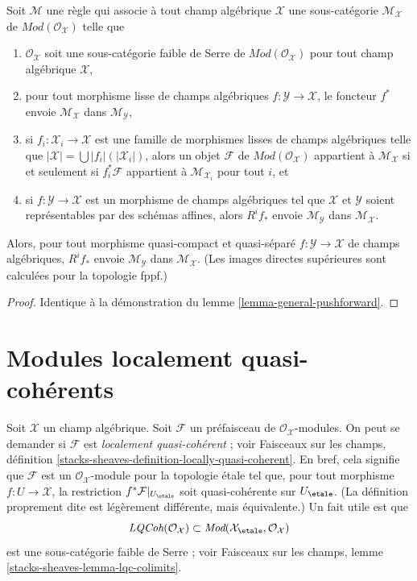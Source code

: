 \begin{lemma}
\label{lemma-general-pushforward-fppf}
Soit $\mathcal{M}$ une règle qui associe à tout champ algébrique
$\mathcal{X}$ une sous-catégorie $\mathcal{M}_\mathcal{X}$ de
$\textit{Mod}(\mathcal{O}_\mathcal{X})$
telle que
\begin{enumerate}
\item $\mathcal{O}_\mathcal{X}$ soit une sous-catégorie faible de Serre
de $\textit{Mod}(\mathcal{O}_\mathcal{X})$
pour tout champ algébrique $\mathcal{X}$,
\item pour tout morphisme lisse de champs algébriques
$f : \mathcal{Y} \to \mathcal{X}$, le foncteur $f^*$ envoie
$\mathcal{M}_\mathcal{X}$ dans $\mathcal{M}_\mathcal{Y}$,
\item si $f_i : \mathcal{X}_i \to \mathcal{X}$ est une famille de morphismes
lisses de champs algébriques telle que
$|\mathcal{X}| = \bigcup |f_i|(|\mathcal{X}_i|)$, alors un objet
$\mathcal{F}$ de $\textit{Mod}(\mathcal{O}_\mathcal{X})$
appartient à $\mathcal{M}_\mathcal{X}$ si et seulement si
$f_i^*\mathcal{F}$ appartient à $\mathcal{M}_{\mathcal{X}_i}$ pour tout $i$, et
\item si $f : \mathcal{Y} \to \mathcal{X}$ est un morphisme de champs
algébriques tel que $\mathcal{X}$ et $\mathcal{Y}$ soient représentables
par des schémas affines, alors $R^if_*$ envoie $\mathcal{M}_\mathcal{Y}$
dans $\mathcal{M}_\mathcal{X}$.
\end{enumerate}
Alors, pour tout morphisme quasi-compact et quasi-séparé
$f : \mathcal{Y} \to \mathcal{X}$ de champs algébriques,
$R^if_*$ envoie $\mathcal{M}_\mathcal{Y}$
dans $\mathcal{M}_\mathcal{X}$. (Les images directes supérieures sont calculées pour la topologie
fppf.)
\end{lemma}

\begin{proof}
Identique à la démonstration du lemme \ref{lemma-general-pushforward}.
\end{proof}


\section{Modules localement quasi-cohérents}
\label{section-locally-quasi-coherent}

\noindent
Soit $\mathcal{X}$ un champ algébrique. Soit $\mathcal{F}$ un préfaisceau
de $\mathcal{O}_\mathcal{X}$-modules. On peut se demander si $\mathcal{F}$
est {\it localement quasi-cohérent} ; voir
Faisceaux sur les champs, définition
\ref{stacks-sheaves-definition-locally-quasi-coherent}.
En bref, cela signifie que $\mathcal{F}$ est un $\mathcal{O}_\mathcal{X}$-module
pour la topologie étale tel que, pour tout morphisme $f : U \to \mathcal{X}$,
la restriction $f^*\mathcal{F}|_{U_\etale}$ soit quasi-cohérente
sur $U_\etale$. (La définition proprement dite est légèrement différente, mais
équivalente.) Un fait utile est que
$$
\textit{LQCoh}(\mathcal{O}_\mathcal{X}) \subset
\textit{Mod}(\mathcal{X}_\etale, \mathcal{O}_\mathcal{X})
$$
est une sous-catégorie faible de Serre ; voir
Faisceaux sur les champs, lemme \ref{stacks-sheaves-lemma-lqc-colimits}.

